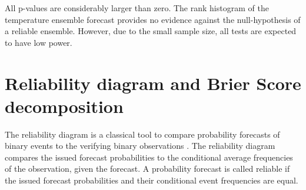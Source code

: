 \documentclass[10pt]{article}\usepackage[]{graphicx}\usepackage[]{color}
\begin{document}
All p-values are considerably larger than zero.
The rank histogram of the temperature ensemble forecast provides no evidence against the null-hypothesis of a reliable ensemble.
However, due to the small sample size, all tests are expected to have low power.

\section{Reliability diagram and Brier Score decomposition}

The reliability diagram is a classical tool to compare probability forecasts of binary events to the verifying binary observations \citep{wilks2011statistical,jolliffe2012forecast}.
The reliability diagram compares the issued forecast probabilities to the conditional average frequencies of the observation, given the forecast.
A probability forecast is called reliable if the issued forecast probabilities and their conditional event frequencies are equal.
\end{document}
